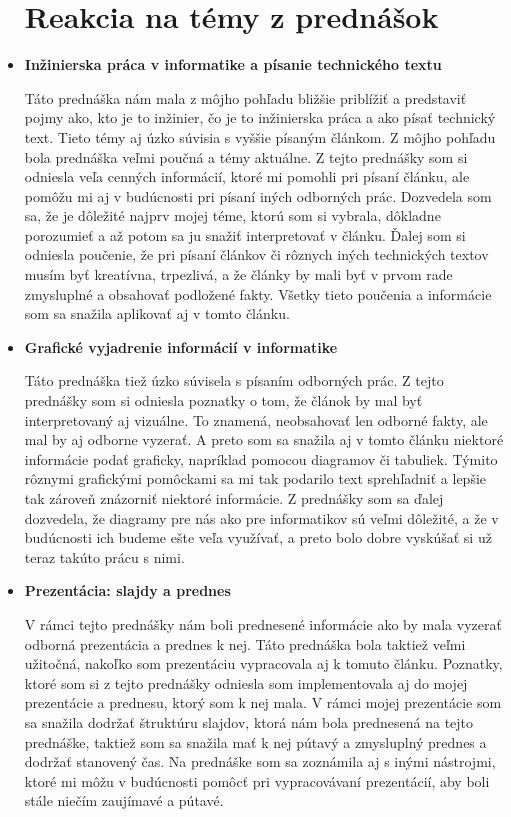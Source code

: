 \documentclass[10pt,twoside,slovak,a4paper]{article}
\begin{document}
\begin{itemize}
\section{Reakcia na témy z prednášok} 
\item \textbf{Inžinierska práca v informatike a písanie technického textu}

\quad Táto prednáška nám mala z môjho pohľadu bližšie priblížiť a predstaviť pojmy ako, kto je to inžinier, čo je to inžinierska práca a ako písať technický text. Tieto témy aj úzko súvisia s vyššie písaným článkom. Z môjho pohľadu bola prednáška veľmi poučná a témy aktuálne. Z tejto prednášky som si odniesla veľa cenných informácií, ktoré mi pomohli pri písaní článku, ale pomôžu mi aj v budúcnosti pri písaní iných odborných prác. Dozvedela som sa, že je dôležité najprv mojej téme, ktorú som si vybrala, dôkladne porozumieť a až potom sa ju snažiť interpretovať v článku. Ďalej som si odniesla poučenie, že pri písaní článkov či rôznych iných technických textov musím byť kreatívna, trpezlivá, a že články by mali byť v prvom rade zmysluplné a obsahovať podložené fakty. Všetky tieto poučenia a informácie som sa snažila aplikovať aj v tomto článku.


\item \textbf{Grafické vyjadrenie informácií v informatike }

\quad Táto prednáška tiež úzko súvisela s písaním odborných prác. Z tejto prednášky som si odniesla poznatky o tom, že článok by mal byť interpretovaný aj vizuálne. To znamená, neobsahovať len odborné fakty, ale mal by aj odborne vyzerať. A preto som sa snažila aj v tomto článku niektoré informácie podať graficky, napríklad pomocou diagramov či tabuliek. Týmito rôznymi grafickými pomôckami sa mi tak podarilo text sprehľadniť a lepšie tak zároveň znázorniť niektoré informácie. Z prednášky som sa ďalej dozvedela, že diagramy pre nás ako pre informatikov sú veľmi dôležité, a že v budúcnosti ich budeme ešte veľa využívať, a preto bolo dobre vyskúšať si už teraz takúto prácu s nimi.

\item \textbf{Prezentácia: slajdy a prednes }

\quad V rámci tejto prednášky nám boli prednesené informácie ako by mala vyzerať odborná prezentácia a prednes k nej. Táto prednáška bola taktiež veľmi užitočná, nakoľko som prezentáciu vypracovala aj k tomuto článku. Poznatky, ktoré som si z tejto prednášky odniesla som implementovala aj do mojej prezentácie a prednesu, ktorý som k nej mala. V rámci mojej prezentácie som sa snažila dodržať štruktúru slajdov, ktorá nám bola prednesená na tejto prednáške, taktiež som sa snažila mať k nej pútavý a zmysluplný prednes a dodržať stanovený čas. Na prednáške som sa zoznámila aj s inými nástrojmi, ktoré mi môžu v budúcnosti pomôcť pri vypracovávaní prezentácií, aby boli stále niečím zaujímavé a pútavé.


\end{itemize}
\end{document}
